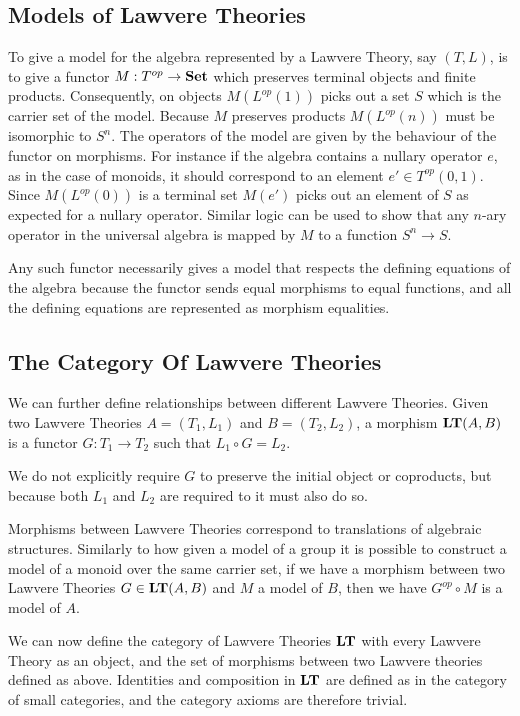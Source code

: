 \subsection{Models of Lawvere Theories}
To give a model\cite{VoevodskyFiore} for the algebra represented by a Lawvere
Theory, say $(T, L)$, is to give a functor $M: T^{op}\to \mathbf{Set}$ which
preserves terminal objects and finite products. Consequently, on objects
$M(L^{op}(1))$ picks out a set $S$ which is the carrier set of the model.
Because $M$ preserves products $M(L^{op}(n))$ must be isomorphic to $S^n$. The
operators of the model are given by the behaviour of the functor on morphisms.
For instance if the algebra contains a nullary operator $e$, as in the case of
monoids, it should correspond to an element $e'\in T^{op}(0,1)$. Since
$M(L^{op}(0))$ is a terminal set $M(e')$ picks out an element of $S$ as expected
for a nullary operator. Similar logic can be used to show that any $n$-ary
operator in the universal algebra is mapped by $M$ to a function $S^n\to S$.

Any such functor necessarily gives a model that respects the defining equations
of the algebra because the functor sends equal morphisms to equal
functions, and all the defining equations are represented as morphism
equalities.

\subsection{The Category Of Lawvere Theories}
We can further define relationships between different Lawvere Theories. Given
two Lawvere Theories $A = (T_1, L_1)$ and $B = (T_2, L_2)$, a
morphism\cite{VoevodskyFiore} $\mathbf{LT}(A, B)$ is a functor $G: T_1\to T_2$
such that $L_1\circ G = L_2$.

We do not explicitly require $G$ to preserve the initial object or coproducts,
but because both $L_1$ and $L_2$ are required to it must also do so.

Morphisms between Lawvere Theories correspond to translations of algebraic
structures. Similarly to how given a model of a group it is possible to
construct a model of a monoid over the same carrier set, if we have a morphism
between two Lawvere Theories $G\in \mathbf{LT}(A, B)$ and $M$ a model of $B$,
then we have $G^{op}\circ M$ is a model of $A$.

We can now define the category of Lawvere Theories $\mathbf{LT}$ with every
Lawvere Theory as an object, and the set of morphisms between two Lawvere
theories defined as above. Identities and composition in $\mathbf{LT}$ are
defined as in the category of small categories, and the category axioms are
therefore trivial.

